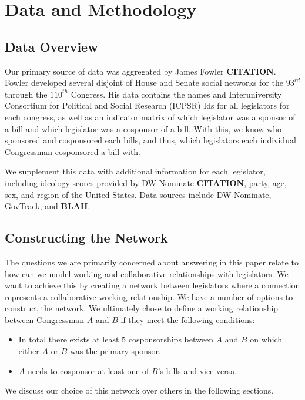 \section{Data and Methodology}

\subsection{Data Overview}

Our primary source of data was aggregated by James Fowler \textbf{CITATION}.
Fowler developed several disjoint of House and Senate social networks for the
$93^{rd}$ through the $110^{th}$ Congress. His data contains the names and
Interuniversity Consortium for Political and Social Research (ICPSR) Ids for all
legislators for each congress, as well as an indicator matrix of which
legislator was a sponsor of a bill and which legislator was a cosponsor of a
bill. With this, we know who sponsored and cosponsored each bills, and thus, 
which legislators each individual Congressman cosponsored a bill with.

We supplement this data with additional information for each legislator, 
including ideology scores provided by DW Nominate \textbf{CITATION}, party, 
age, sex, and region of the United States. Data sources include DW Nominate, 
GovTrack, and \textbf{BLAH}.

\subsection{Constructing the Network}

The questions we are primarily concerned about answering in this paper relate 
to how can we model working and collaborative relationships with legislators. 
We want to achieve this by creating a network between legislators where a 
connection represents a collaborative working relationship. We have a number of 
options to construct the network. We ultimately chose to define a working 
relationship between Congressman $A$ and $B$ if they meet the following 
conditions:

\begin{itemize}
	\item In total there exists at least $5$ cosponsorships between $A$ and $B$ 
	on which either $A$ or $B$ was the primary sponsor.
	\item $A$ needs to cosponsor at least one of $B$'s bills and vice versa.
\end{itemize}

We discuss our choice of this network over others in the following sections.


